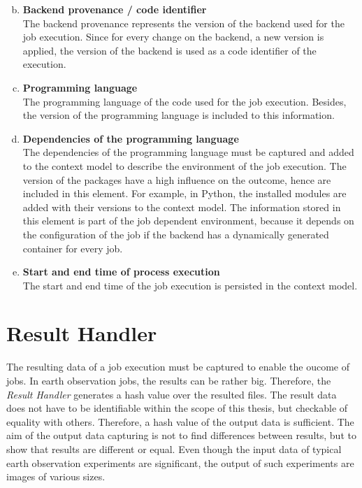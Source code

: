 \documentclass[draft,final]{vutinfth} %
\begin{document}
\begin{enumerate}[(a)]
	\setcounter{enumi}{1}
	\item \textbf{Backend provenance / code identifier} \\
	The backend provenance represents the version of the backend used for the job execution. Since for every change on the backend, a new version is applied, the version of the backend is used as a code identifier of the execution.
	\item \textbf{Programming language}\\
	The programming language of the code used for the job execution. Besides, the version of the programming language is included to this information.
	\item \textbf{Dependencies of the programming language}\\
	The dependencies of the programming language must be captured and added to the context model to describe the environment of the job execution. The version of the packages have a high influence on the outcome, hence are included in this element. For example, in Python, the installed modules are added with their versions to the context model. The information stored in this element is part of the job dependent environment, because it depends on the configuration of the job if the backend has a dynamically generated container for every job.
	\item \textbf{Start and end time of process execution}\\
	The start and end time of the job execution is persisted in the context model.
\end{enumerate}

\section{Result Handler}\label{Design:Result Handler}
The resulting data of a job execution must be captured to enable the oucome of jobs. In earth observation jobs, the results can be rather big. Therefore, the \textit{Result Handler} generates a hash value over the resulted files. The result data does not have to be identifiable within the scope of this thesis, but checkable of equality with others. Therefore, a hash value of the output data is sufficient. The aim of the output data capturing is not to find differences between results, but to show that results are different or equal. Even though the input data of typical earth observation experiments are significant, the output of such experiments are images of various sizes.
\end{document}
